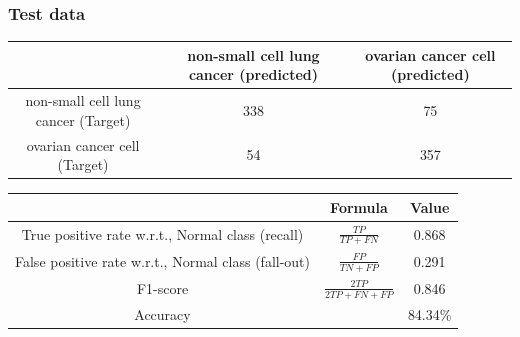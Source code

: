 \documentclass[fleqn]{article}
\begin{document}
\subsubsection{Test data}

\begin{center}
  \begin{longtable}{ c | c | c  }
	\multicolumn{1}{c}{ } & 
	\multicolumn{1}{c}{non-small cell lung cancer (predicted)} & 
	\multicolumn{1}{c}{ovarian cancer cell (predicted)} \\
    \hline
    non-small cell lung cancer (Target)& 338 & 75 \\ \hline
    ovarian cancer cell (Target)&  54 & 357 \\ \hline
  \end{longtable}
\end{center}    

\begin{center}
  \begin{longtable}{ c | c | c  }
  	\multicolumn{1}{c}{ } & 
	\multicolumn{1}{c}{Formula} & 
	\multicolumn{1}{c}{Value} \\\hline
	True positive rate w.r.t., Normal class (recall)  & $\frac{TP}{TP + FN}$ & 0.868 \\\hline
	False positive rate w.r.t., Normal class (fall-out)  & $\frac{FP}{TN + FP}$ & 0.291\\\hline
	F1-score & $\frac{2TP}{2TP + FN + FP}$ & 0.846\\\hline
	Accuracy  & & 84.34\%\\\hline
  \end{longtable}
\end{center} 
\end{document}
